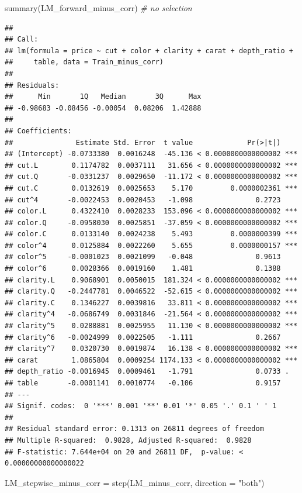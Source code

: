 \documentclass[
]{article}
\newenvironment{Shaded}{\begin{snugshade}}{\end{snugshade}}
\newcommand{\AttributeTok}[1]{\textcolor[rgb]{0.77,0.63,0.00}{#1}}
\newcommand{\CommentTok}[1]{\textcolor[rgb]{0.56,0.35,0.01}{\textit{#1}}}
\newcommand{\FunctionTok}[1]{\textcolor[rgb]{0.00,0.00,0.00}{#1}}
\newcommand{\NormalTok}[1]{#1}
\newcommand{\OtherTok}[1]{\textcolor[rgb]{0.56,0.35,0.01}{#1}}
\newcommand{\StringTok}[1]{\textcolor[rgb]{0.31,0.60,0.02}{#1}}
\begin{document}
\begin{Shaded}
\begin{Highlighting}[]
\FunctionTok{summary}\NormalTok{(LM\_forward\_minus\_corr)    }\CommentTok{\# no selection}
\end{Highlighting}
\end{Shaded}

\begin{verbatim}
##
## Call:
## lm(formula = price ~ cut + color + clarity + carat + depth_ratio +
##     table, data = Train_minus_corr)
##
## Residuals:
##      Min       1Q   Median       3Q      Max
## -0.98683 -0.08456 -0.00054  0.08206  1.42888
##
## Coefficients:
##               Estimate Std. Error  t value             Pr(>|t|)
## (Intercept) -0.0733380  0.0016248  -45.136 < 0.0000000000000002 ***
## cut.L        0.1174782  0.0037111   31.656 < 0.0000000000000002 ***
## cut.Q       -0.0331237  0.0029650  -11.172 < 0.0000000000000002 ***
## cut.C        0.0132619  0.0025653    5.170         0.0000002361 ***
## cut^4       -0.0022453  0.0020453   -1.098               0.2723
## color.L      0.4322410  0.0028233  153.096 < 0.0000000000000002 ***
## color.Q     -0.0958030  0.0025851  -37.059 < 0.0000000000000002 ***
## color.C      0.0133140  0.0024238    5.493         0.0000000399 ***
## color^4      0.0125884  0.0022260    5.655         0.0000000157 ***
## color^5     -0.0001023  0.0021099   -0.048               0.9613
## color^6      0.0028366  0.0019160    1.481               0.1388
## clarity.L    0.9068901  0.0050015  181.324 < 0.0000000000000002 ***
## clarity.Q   -0.2447781  0.0046522  -52.615 < 0.0000000000000002 ***
## clarity.C    0.1346227  0.0039816   33.811 < 0.0000000000000002 ***
## clarity^4   -0.0686749  0.0031846  -21.564 < 0.0000000000000002 ***
## clarity^5    0.0288881  0.0025955   11.130 < 0.0000000000000002 ***
## clarity^6   -0.0024999  0.0022505   -1.111               0.2667
## clarity^7    0.0320730  0.0019874   16.138 < 0.0000000000000002 ***
## carat        1.0865804  0.0009254 1174.133 < 0.0000000000000002 ***
## depth_ratio -0.0016945  0.0009461   -1.791               0.0733 .
## table       -0.0001141  0.0010774   -0.106               0.9157
## ---
## Signif. codes:  0 '***' 0.001 '**' 0.01 '*' 0.05 '.' 0.1 ' ' 1
##
## Residual standard error: 0.1313 on 26811 degrees of freedom
## Multiple R-squared:  0.9828, Adjusted R-squared:  0.9828
## F-statistic: 7.644e+04 on 20 and 26811 DF,  p-value: < 0.00000000000000022
\end{verbatim}

\begin{Shaded}
\begin{Highlighting}[]
\NormalTok{LM\_stepwise\_minus\_corr }\OtherTok{=} \FunctionTok{step}\NormalTok{(LM\_minus\_corr, }\AttributeTok{direction =} \StringTok{"both"}\NormalTok{)}
\end{Highlighting}
\end{Shaded}
\end{document}
